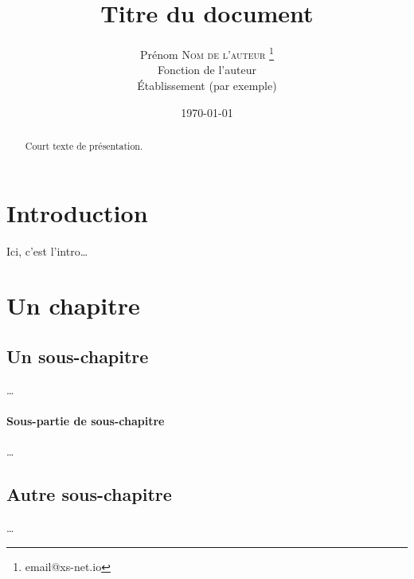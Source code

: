\documentclass[frenchb, 12pt, twoside, a4paper]{article}
\title{Titre du document}
\author{
  Prénom \textsc{Nom de l'auteur} 
  \thanks{email@xs-net.io} \\           %
  Fonction de l'auteur \\
  Établissement (par exemple) \\
  }
\date{\today}                           %
\begin{document}
\maketitle                              %

{
\renewcommand{\contentsname}{Sommaire}  %
\tableofcontents                        %
}


\begin{abstract}
Court texte de présentation.
\end{abstract}



\section*{Introduction}

Ici, c'est l'intro…

\section{Un chapitre}

%


\subsection{Un sous-chapitre}
…
\paragraph{Sous-partie de sous-chapitre}
…


\subsection{Autre sous-chapitre}
…


\end{document}
